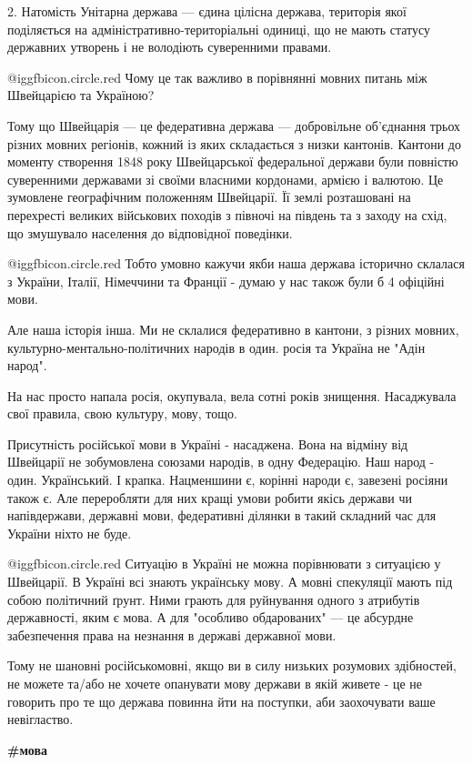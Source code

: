 2. Натомість Унітарна держава — єдина цілісна держава, територія якої
поділяється на адміністративно-територіальні одиниці, що не мають статусу
державних утворень і не володіють суверенними правами.

 @igg{fbicon.circle.red}  Чому це так важливо в порівнянні мовних питань між Швейцарією та Україною? 

Тому що Швейцарія — це федеративна держава — добровільне об’єднання трьох
різних мовних регіонів, кожний із яких складається з низки кантонів. Кантони до
моменту створення 1848 року Швейцарської федеральної держави були повністю
суверенними державами зі своїми власними кордонами, армією і валютою. Це
зумовлене географічним положенням Швейцарії. Її землі розташовані на перехресті
великих військових походів з півночі на південь та з заходу на схід, що
змушувало населення до відповідної поведінки.

 @igg{fbicon.circle.red}  Тобто умовно кажучи якби наша держава історично склалася з України, Італії,
Німеччини та Франції - думаю у нас також були б 4 офіційні мови. 

Але наша історія інша. Ми не склалися федеративно в кантони, з різних мовних,
культурно-ментально-політичних народів в один. росія та Україна не "Адін
народ".

На нас просто напала росія, окупувала, вела сотні років знищення. Насаджувала
свої правила, свою культуру, мову, тощо. 

Присутність російської мови в Україні - насаджена. Вона на відміну від
Швейцарії не зобумовлена союзами народів, в одну Федерацію. Наш народ - один.
Український. І крапка. Нацменшини є, корінні народи є, завезені росіяни також
є. Але переробляти для них кращі умови робити якісь держави чи напівдержави,
державні мови, федеративні ділянки в такий складний час для України ніхто не
буде.

 @igg{fbicon.circle.red}  Ситуацію в Україні не можна порівнювати з ситуацією у Швейцарії. В Україні
всі знають українську мову. А мовні спекуляції мають під собою політичний
ґрунт. Ними грають для руйнування одного з атрибутів державності, яким є мова.
А для "особливо обдарованих" — це абсурдне забезпечення права на незнання в
державі державної мови.

Тому не шановні російськомовні, якщо ви в силу низьких розумових здібностей, не
можете та/або не хочете опанувати мову держави в якій живете - це не говорить
про те що держава повинна йти на поступки, аби заохочувати ваше невігластво.

\textbf{\#мова}
